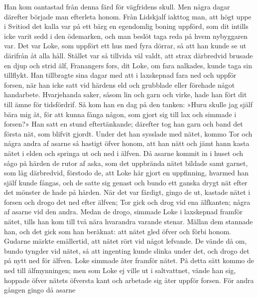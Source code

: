 Han kom oantastad från denna färd för vägfridens skull. Men några dagar
därefter började man efterleta honom. Från Lidskjalf iakttog man, att
högt uppe i Svitiod det kalla var på ett bärg en egendomlig boning
uppförd, som dit intills icke varit sedd i den ödemarken, och man beslöt
taga reda på hvem nybyggaren var. Det var Loke, som uppfört ett hus med
fyra dörrar, så att han kunde se ut därifrån åt alla håll. Stället var
så tillvida väl valdt, att strax därbredvid brusade en djup och strid
älf, Franangers fors, dit Loke, om fara nalkades, kunde taga sin
tillflykt. Han tillbragte sina dagar med att i laxskepnad fara ned och
uppför forsen, när han icke satt vid härdens eld och grubblade eller
förehade något handarbete. Hvarjehanda saker, såsom lin och garn och
virke, hade han fört dit till ämne för tidsfördrif. Så kom han en dag på
den tanken: »Huru skulle jag själf bära mig åt, för att kunna fånga
någon, som gjort sig till lax och simmade i forsen?» Han satt en stund
eftertänkande; därefter tog han garn och band det första nät, som
blifvit gjordt. Under det han sysslade med nätet, kommo Tor och några
andra af asarne så hastigt öfver honom, att han nätt och jämt hann kasta
nätet i elden och springa ut och ned i älfven. Då asarne kommit in i
huset och sågo på härden de rutor af aska, som det uppbrända nätet
bildade samt garnet, som låg därbredvid, förstodo de, att Loke här gjort
en uppfinning, hvarmed han själf kunde fångas, och de satte sig genast
och bundo ett ganska drygt nät efter det mönster de hade på härden. När
det var färdigt, gingo de ut, kastade nätet i forsen och drogo det ned
efter älfven; Tor gick och drog vid ena älfkanten; några af asarne vid
den andra. Medan de drogo, simmade Loke i laxskepnad framför nätet,
tills han
\protect\hypertarget{lb1625905.xhtmlux5cux23start174}{}{}\protect\hypertarget{lb1625905.xhtmlux5cux23start174-a}{}{}\protect\hypertarget{lb1625905.xhtmlux5cux23start174-b}{}{}\protect\hypertarget{lb1625905.xhtmlux5cux23start174-c}{}{}\protect\hypertarget{lb1625905.xhtmlux5cux23start174-d}{}{}
kom till två nära hvarandra varande stenar. Mällan dem stannade han, och
det gick som han beräknat: att nätet gled öfver och förbi honom. Gudarne
märkte emällertid, att nätet rört vid något lefvande. De vände då om,
bundo tyngder vid nätet, så att ingenting kunde slinka under det, och
drogo det på nytt ned för älfven. Loke simmade åter framför nätet. På
detta sätt kommo de ned till älfmynningen; men som Loke ej ville ut i
saltvattnet, vände han sig, hoppade öfver nätets öfversta kant och
arbetade sig åter uppför forsen. För andra gången gingo då asarne
